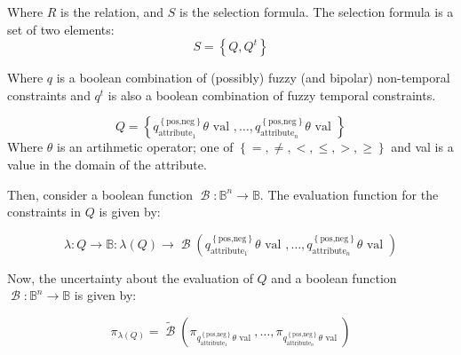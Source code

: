 \documentclass{llncs}
\newcommand{\bool}{\operatorname*{\mathcal{B}}}
\newcommand{\Boolean}{\mathbb{B}}
\begin{document}
Where $R$ is the relation, and $S$ is the selection formula. The selection formula is a set of two elements:
\begin{equation}
 \label{eq:selection_formula}
S = \left \lbrace Q, Q^{t}\right \rbrace
\end{equation}

Where $q$ is a boolean combination of (possibly) fuzzy (and bipolar) non-temporal constraints and $q^{t}$ is also a boolean combination of fuzzy temporal constraints.

\begin{equation}
 \label{eq:non-temporal-constraints}
Q = \left \lbrace q^{\left \lbrace \mbox{pos,neg} \right \rbrace}_{\mbox{attribute}_1}  \theta \mbox{ val }, \ldots, q^{\left \lbrace \mbox{pos,neg} \right \rbrace}_{\mbox{attribute}_n}  \theta \mbox{ val } \right \rbrace
\end{equation}
Where $\theta$ is an artihmetic operator; one of $\left \lbrace =, \neq, <, \leq, >, \geq \right \rbrace$ and val is a value in the domain of the attribute. 

Then, consider a boolean function $\bool:\Boolean^{n}  \rightarrow \Boolean$. The evaluation function for the constraints in $Q$  is given by:

\begin{equation}
 \label{eq:evaluation-function}
\lambda : Q \rightarrow \Boolean : \lambda (Q) \rightarrow \bool \left(q^{\left \lbrace \mbox{pos,neg} \right \rbrace}_{\mbox{attribute}_1}  \theta \mbox{ val }, \ldots, q^{\left \lbrace \mbox{pos,neg} \right \rbrace}_{\mbox{attribute}_n}  \theta \mbox{ val } \right)
\end{equation}

Now, the uncertainty about the evaluation of $Q$ and a boolean function $\bool:\Boolean^{n}  \rightarrow \Boolean$ is given by:

\begin{equation}
 \label{eq:evaluation-lambda-function}
\pi_{\lambda \left(Q \right)} = \tilde{\bool} \left(\pi_{q^{\left \lbrace \mbox{pos,neg} \right \rbrace}_{\mbox{attribute}_1}  \theta \mbox{ val }}, \ldots, \pi_{q^{\left \lbrace \mbox{pos,neg} \right \rbrace}_{\mbox{attribute}_n}  \theta \mbox{ val }} \right)
\end{equation}
\end{document}
